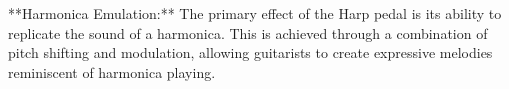 **Harmonica Emulation:**  
The primary effect of the Harp pedal is its ability to replicate the sound of a harmonica. This is achieved through a combination of pitch shifting and modulation, allowing guitarists to create expressive melodies reminiscent of harmonica playing.
